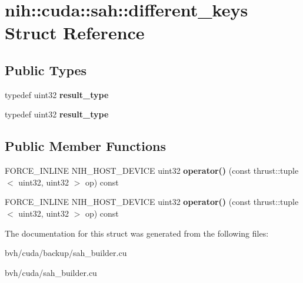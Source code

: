 \hypertarget{structnih_1_1cuda_1_1sah_1_1different__keys}{
\section{nih\-:\-:cuda\-:\-:sah\-:\-:different\-\_\-keys \-Struct \-Reference}
\label{structnih_1_1cuda_1_1sah_1_1different__keys}
}
\subsection*{\-Public \-Types}
\begin{DoxyCompactItemize}
\item 
\hypertarget{structnih_1_1cuda_1_1sah_1_1different__keys_ae76a9565840a05be88a37de3abb83528}{
typedef uint32 {\bfseries result\-\_\-type}}
\label{structnih_1_1cuda_1_1sah_1_1different__keys_ae76a9565840a05be88a37de3abb83528}

\item 
\hypertarget{structnih_1_1cuda_1_1sah_1_1different__keys_ae76a9565840a05be88a37de3abb83528}{
typedef uint32 {\bfseries result\-\_\-type}}
\label{structnih_1_1cuda_1_1sah_1_1different__keys_ae76a9565840a05be88a37de3abb83528}

\end{DoxyCompactItemize}
\subsection*{\-Public \-Member \-Functions}
\begin{DoxyCompactItemize}
\item 
\hypertarget{structnih_1_1cuda_1_1sah_1_1different__keys_a3bb3f7f47e82a3c2e8b22b0b1aaa9783}{
\-F\-O\-R\-C\-E\-\_\-\-I\-N\-L\-I\-N\-E \-N\-I\-H\-\_\-\-H\-O\-S\-T\-\_\-\-D\-E\-V\-I\-C\-E uint32 {\bfseries operator()} (const thrust\-::tuple$<$ uint32, uint32 $>$ op) const }
\label{structnih_1_1cuda_1_1sah_1_1different__keys_a3bb3f7f47e82a3c2e8b22b0b1aaa9783}

\item 
\hypertarget{structnih_1_1cuda_1_1sah_1_1different__keys_a3bb3f7f47e82a3c2e8b22b0b1aaa9783}{
\-F\-O\-R\-C\-E\-\_\-\-I\-N\-L\-I\-N\-E \-N\-I\-H\-\_\-\-H\-O\-S\-T\-\_\-\-D\-E\-V\-I\-C\-E uint32 {\bfseries operator()} (const thrust\-::tuple$<$ uint32, uint32 $>$ op) const }
\label{structnih_1_1cuda_1_1sah_1_1different__keys_a3bb3f7f47e82a3c2e8b22b0b1aaa9783}

\end{DoxyCompactItemize}


\-The documentation for this struct was generated from the following files\-:\begin{DoxyCompactItemize}
\item 
bvh/cuda/backup/sah\-\_\-builder.\-cu\item 
bvh/cuda/sah\-\_\-builder.\-cu\end{DoxyCompactItemize}
